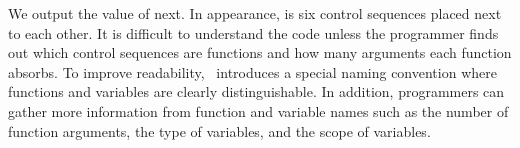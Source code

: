\documentclass{ltugboat}
\begin{document}
We output the value of  next.
In appearance,  is six control sequences placed next to each other.
It is difficult to understand the code unless the programmer finds out which control sequences are functions and how many arguments each function absorbs.
To improve readability, \liii\ introduces a special naming convention where functions and variables are clearly distinguishable. In addition, programmers can gather more information from function and variable names such as the number of function arguments, the type of variables, and the scope of variables. 
\end{document}

